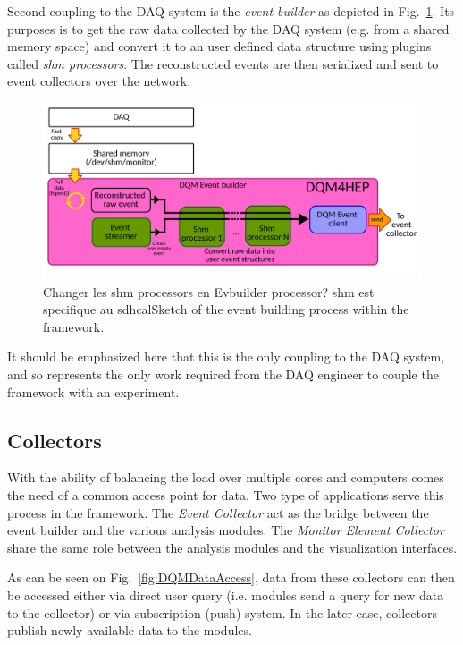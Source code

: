 \documentclass[conference]{IEEEtran}
\begin{document}
Second coupling to the DAQ system is the \textit{event builder} as depicted in Fig.~\ref{fig:DQMEventBuilder}. Its purposes is to get the raw data collected by the DAQ system (e.g. from a shared memory space) and convert it to an user defined data structure using plugins called {\color{red}\textit{shm processors}}. The reconstructed events are then serialized and sent to event collectors over the network.

\begin{figure}[htbp]
  \begin{center}
    \includegraphics[width=0.95\linewidth]{figs/EventBuilderDiagram_IEEE.pdf}
    \caption{\label{fig:DQMEventBuilder} {\color{red} Changer les shm processors en Evbuilder processor? shm est specifique au sdhcal}Sketch of the event building process within the framework.}
  \end{center}
\end{figure}

It should be emphasized here that this is the only coupling to the DAQ system, and so represents the only work required from the DAQ engineer to couple the framework with an experiment.


\subsection{Collectors}
With the ability of balancing the load over multiple cores and computers comes the need of a common access point for data. Two type of applications serve this process in the framework. The \textit{Event Collector} act as the bridge between the event builder and the various analysis modules. The \textit{Monitor Element Collector} share the same role between the analysis modules and the visualization interfaces.

As can be seen on Fig.~\ref{fig:DQMDataAccess}, data from these collectors can then be accessed either via direct user query (i.e. modules send a query for new data to the collector) or via subscription ({\color{red}push}) system. In the later case, collectors publish newly available data to the modules.
\end{document}
